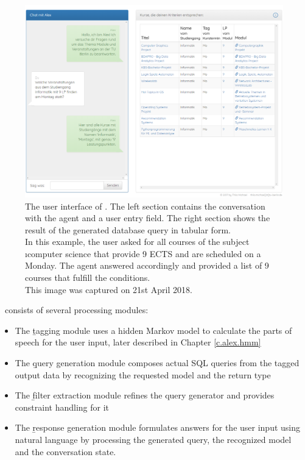 \vspace{1em}
\begin{figure}[H]
	\includegraphics[width=\textwidth]{images/alex_screencapture}
	\vspace{.1em}
	\caption[User Interface of \Alex]{The user interface of \Alex. The left section contains the conversation with the agent and a user entry field. The right section shows the result of the generated database query in tabular form.\\In this example, the user asked for all courses of the subject \i{computer science} that provide 9 ECTS and are scheduled on a Monday. The agent answered accordingly and provided a list of 9 courses that fulfill the conditions.\\This image was captured on 21st April 2018.}
	\label{f.alex_ui}
\end{figure}

\Alex\ consists of several processing modules:

\begin{itemize}
	\item The \b{tagging module} uses a hidden Markov model to calculate the parts of speech for the user input, later described in Chapter \ref{c.alex.hmm}
	\item The \b{query generation module} composes actual SQL queries from the tagged output data by recognizing the requested model and the return type
	\item The \b{filter extraction module} refines the query generator and provides constraint handling for it
	\item The \b{response generation module} formulates answers for the user input using natural language by processing the generated query, the recognized model and the conversation state.
\end{itemize}

